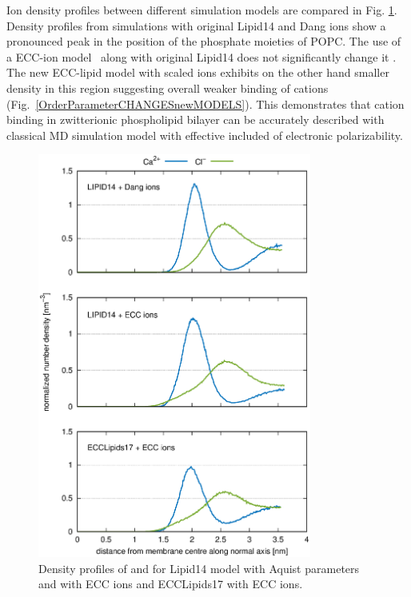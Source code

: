 \documentclass[aip,jcp,twocolumn]{revtex4}
\begin{document}
Ion density profiles between different simulation models are compared in Fig. \ref{fig:cacl-dens}.
Density profiles from simulations with original Lipid14 and Dang ions \cite{smith94,chang1999,dang2006} 
show a pronounced peak in the position of the phosphate moieties of POPC. 
The use of a ECC-ion model~\cite{kohagen14,kohagen16} along with original Lipid14 does not significantly change it
.
The new ECC-lipid model with scaled ions exhibits on the other hand smaller density in this region 
suggesting overall weaker binding of cations (Fig.~\ref{OrderParameterCHANGESnewMODELS}). 
This demonstrates that cation binding in zwitterionic phospholipid bilayer can be accurately
described with classical MD simulation model with effective included of electronic polarizability.

\begin{figure}[]
  \centering
  \includegraphics[width=9.0cm,angle=0]{../Fig/CAdensities.eps}
  \caption{\label{fig:cacl-dens}
    Density profiles of  and  for Lipid14 model with Aquist parameters
    and with ECC ions and ECCLipids17 with ECC ions. }
\end{figure}
\end{document}
